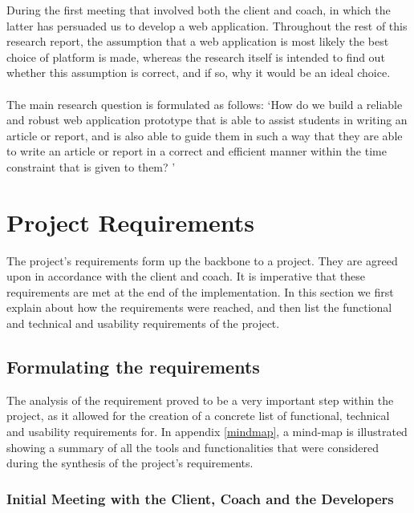 During the first meeting that involved both the client and coach, in which the latter has persuaded us to develop a web application. Throughout the rest of this research report, the assumption that a web application is most likely the best choice of platform is made, whereas the research itself is intended to find out whether this assumption is correct, and if so, why it would be an ideal choice. \\\\

The main research question is formulated as follows: `How do we build a reliable and robust web application prototype that is able to assist students in writing an article or report, and is also able to guide them in such a way that they are able to write an article or report in a correct and efficient manner within the time constraint that is given to them? '

\section{Project Requirements}

The project's requirements form up the backbone to a project. They are agreed upon in accordance with the client and coach. It is imperative that these requirements are met at the end of the implementation. In this section we first explain about how the requirements were reached, and then list the functional and technical and usability requirements of the project.

\subsection{Formulating the requirements} %
\label{sub:subsection_name}
The analysis of the requirement proved to be a very important step within the project, as it allowed for the creation of a concrete list of functional, technical and usability requirements for. In appendix \ref{mindmap}, a mind-map is illustrated showing a summary of all the tools and functionalities that were considered during the synthesis of the project's requirements.


\subsubsection{Initial Meeting with the Client, Coach and the Developers} %
\label{sub:meeting_client_coach_developer_team_meeting_}

